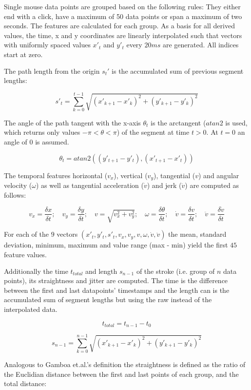 \documentclass[
    fontsize=12pt,
    headings=small,
    parskip=half,           %
    bibliography=totoc,
    numbers=noenddot,       %
    open=any,               %
    final,                   %
    table
]{scrreprt}
\begin{document}
Single mouse data points are grouped based on the following rules: They either end with a click, have a maximum of 50 data points or span a maximum of two seconds. The features are calculated for each group. As a basis for all derived values, the time, x and y coordinates are linearly interpolated such that vectors with uniformly spaced values $x'_t$ and $y'_t$ every $20ms$ are generated. All indices start at zero.

The path length from the origin $s_t'$ is the accumulated sum of previous segment lengths:

\[
s'_t = \sum_{k = 0}^{t - 1} \sqrt{(x'_{k+1} - x'_{k})^2 + (y'_{k+1} - y'_{k})^2}
\]

The angle of the path tangent with the x-axis $\theta_t$ is the arctangent ($atan2$ is used, which returns only values $-\pi < \theta < \pi$) of the segment at time $t > 0$. At $t=0$ an angle of $0$ is assumed.

\[
\theta_t = atan2( (y'_{t+1} - y'_{t}), (x'_{t+1} - x'_{t}) )
\]

The temporal features horizontal ($v_x$), vertical ($v_y$), tangential ($v$) and angular velocity ($\omega$) as well as tangential acceleration ($\dot{v}$) and jerk ($\ddot{v}$) are computed as follows:

\[
v_x = \frac{\delta x}{\delta t}; \quad
v_y = \frac{\delta y}{\delta t}; \quad
v = \sqrt{v_x^2 + v_y^2}; \quad
\omega = \frac{\delta \theta}{\delta t}; \quad
\dot{v} = \frac{\delta v}{\delta t}; \quad
\ddot{v} = \frac{\delta \dot{v}}{\delta t}
\]

For each of the $9$ vectors $(x'_t, y'_t, s'_t, v_x, v_y, v, \omega, \dot{v}, \ddot{v})$ the mean, standard deviation, minimum, maximum and value range (max - min) yield the first $45$ feature values.

Additionally the time $t_{total}$ and length $s_{n-1}$ of the stroke (i.e. group of $n$ data points), its straightness and jitter are computed. The time is the difference between the first and last datapoints' timestamps and the length can is the accumulated sum of segment lengths but using the raw instead of the interpolated data.

\[
t_{total} = t_{n-1} - t_0
\]

\[
s_{n-1} = \sum_{k = 0}^{n - 1} \sqrt{(x'_{k+1} - x'_{k})^2 + (y'_{k+1} - y'_{k})^2}
\]

Analogous to Gamboa et.al.'s definition\cite{GAMBOA2004} the straightness is defined as the ratio of the Euclidian distance between the first and last points of each group, and the total distance:
\end{document}

